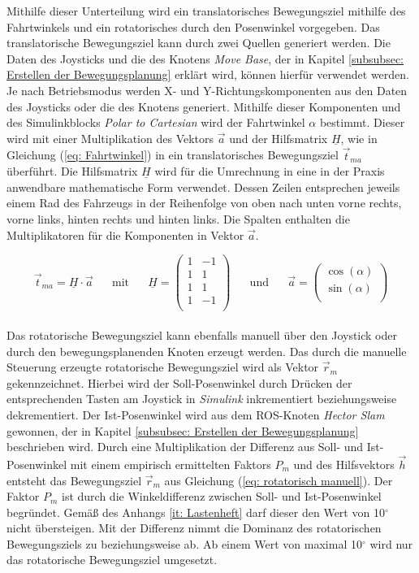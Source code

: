 		Mithilfe dieser Unterteilung wird ein translatorisches Bewegungsziel mithilfe des Fahrtwinkels und ein rotatorisches durch den Posenwinkel vorgegeben. Das translatorische Bewegungsziel kann durch zwei Quellen generiert werden. Die Daten des Joysticks und die des Knotens \textit{Move Base}, der in Kapitel \ref{subsubsec: Erstellen der Bewegungsplanung} erklärt wird, können hierfür verwendet werden. Je nach Betriebsmodus werden X- und Y-Richtungskomponenten aus den Daten des Joysticks oder die des Knotens generiert. Mithilfe dieser Komponenten und des Simulinkblocks \textit{Polar to Cartesian} wird der Fahrtwinkel $\alpha$ bestimmt. Dieser wird mit einer Multiplikation des Vektors $\vec{a}$ und der Hilfsmatrix $\underline{H}$, wie in Gleichung (\ref{eq: Fahrtwinkel}) in ein translatorisches Bewegungsziel $\vec{t}_{ma}$ überführt. Die Hilfsmatrix $\underline{H}$ wird für die Umrechnung in eine in der Praxis anwendbare mathematische Form verwendet. Dessen Zeilen entsprechen jeweils einem Rad des Fahrzeugs in der Reihenfolge von oben nach unten vorne rechts, vorne links, hinten rechts und hinten links. Die Spalten enthalten die Multiplikatoren für die Komponenten in Vektor $\vec{a}$. 
		
		\begin{equation}
		\vec{t}_{ma} = \underline{H} \cdot \vec{a}
		\text{ }
		\text{ }
		\text{ mit }
		\text{ }
		\text{ }
		\underline{H}=\left(
		\begin{array}{rr}
		1&-1\\
		1&1\\
		1&1\\
		1&-1\\
		\end{array}\right)
		\text{ }
		\text{ }
		\text{ und }
		\text{ }
		\text{ }
		\vec{a}=\left(
		\begin{array}{c}
		\cos(\alpha)\\
		\sin(\alpha)\\
		\end{array}\right)
		\label{eq: Fahrtwinkel} 
		\end{equation}\\				
		Das rotatorische Bewegungsziel kann ebenfalls manuell über den Joystick oder durch den bewegungsplanenden Knoten erzeugt werden. Das durch die manuelle Steuerung erzeugte rotatorische Bewegungsziel wird als Vektor $\vec{r}_m$ gekennzeichnet. Hierbei wird der Soll-Posenwinkel durch Drücken der entsprechenden Tasten am Joystick in \textit{Simulink} inkrementiert beziehungsweise dekrementiert. Der Ist-Posenwinkel wird aus dem ROS-Knoten \textit{Hector Slam} gewonnen, der in Kapitel \ref{subsubsec: Erstellen der Bewegungsplanung} beschrieben wird. Durch eine Multiplikation der Differenz aus Soll- und Ist-Posenwinkel mit einem empirisch ermittelten Faktors $P_m$ und des Hilfsvektors $\vec{h}$ entsteht das Bewegungsziel $\vec{r}_m$ aus Gleichung (\ref{eq: rotatorisch manuell}). Der Faktor $P_m$ ist durch die Winkeldifferenz zwischen Soll- und Ist-Posenwinkel begründet. Gemäß des Anhangs \ref{it: Lastenheft} darf dieser den Wert von 10$^\circ$ nicht übersteigen. Mit der Differenz nimmt die Dominanz des rotatorischen Bewegungsziels zu beziehungsweise ab. Ab einem Wert von maximal 10$^\circ$ wird nur das rotatorische Bewegungsziel umgesetzt.
		
